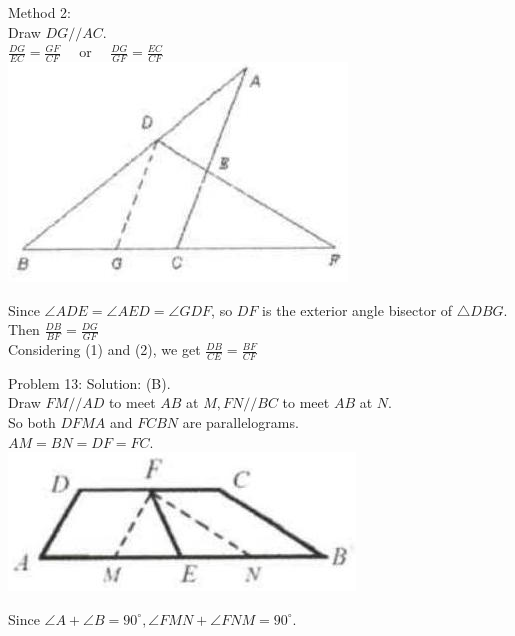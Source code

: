 \documentclass[10pt]{article}
\begin{document}
Method 2:\\
Draw \(D G / / A C\).\\
\(\frac{D G}{E C}=\frac{G F}{C F} \quad\) or \(\quad \frac{D G}{G F}=\frac{E C}{C F}\)\\
\includegraphics[max width=\textwidth, center]{2025_04_17_97bc1f7e44d93c271a88g-137(1)}

Since \(\angle A D E=\angle A E D=\angle G D F\), so \(D F\) is the exterior angle bisector of \(\triangle D B G\).\\
Then \(\frac{D B}{B F}=\frac{D G}{G F}\)\\
Considering (1) and (2), we get \(\frac{D B}{C E}=\frac{B F}{C F}\)

Problem 13: Solution: (B).\\
Draw \(F M / / A D\) to meet \(A B\) at \(M, F N / / B C\) to meet \(A B\) at \(N\).\\
So both \(D F M A\) and \(F C B N\) are parallelograms.\\
\(A M=B N=D F=F C\).\\
\includegraphics[max width=\textwidth, center]{2025_04_17_97bc1f7e44d93c271a88g-137}

Since \(\angle A+\angle B=90^{\circ}, \angle F M N+\angle F N M=90^{\circ}\).
\end{document}
